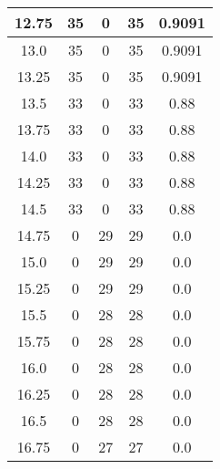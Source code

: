 \documentclass[letterpaper, 12pt]{article}
\begin{document}
\begin{longtable}{|c|c|c|c|c|}
\hline
12.75 & 35 & 0 & 35 & 0.9091 \\
\hline
13.0 & 35 & 0 & 35 & 0.9091 \\
\hline
13.25 & 35 & 0 & 35 & 0.9091 \\
\hline
13.5 & 33 & 0 & 33 & 0.88 \\
\hline
13.75 & 33 & 0 & 33 & 0.88 \\
\hline
14.0 & 33 & 0 & 33 & 0.88 \\
\hline
14.25 & 33 & 0 & 33 & 0.88 \\
\hline
14.5 & 33 & 0 & 33 & 0.88 \\
\hline
14.75 & 0 & 29 & 29 & 0.0 \\
\hline
15.0 & 0 & 29 & 29 & 0.0 \\
\hline
15.25 & 0 & 29 & 29 & 0.0 \\
\hline
15.5 & 0 & 28 & 28 & 0.0 \\
\hline
15.75 & 0 & 28 & 28 & 0.0 \\
\hline
16.0 & 0 & 28 & 28 & 0.0 \\
\hline
16.25 & 0 & 28 & 28 & 0.0 \\
\hline
16.5 & 0 & 28 & 28 & 0.0 \\
\hline
16.75 & 0 & 27 & 27 & 0.0 \\
\hline
\end{longtable}
\end{document}
